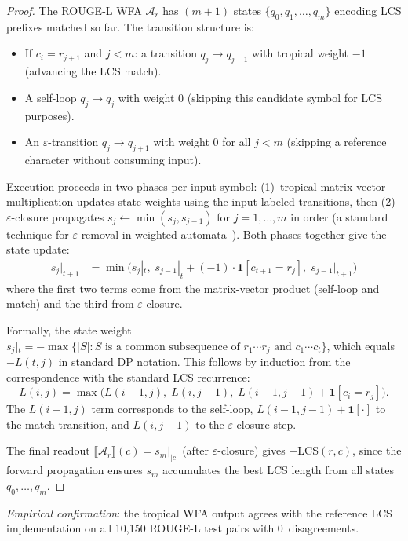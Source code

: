 \documentclass[11pt]{article}
\newcommand{\wfa}{\mathcal{A}}
\begin{document}
\begin{proof}
The ROUGE-L WFA $\wfa_r$ has $(m+1)$ states
$\{q_0, q_1, \ldots, q_m\}$ encoding LCS prefixes matched so far.
The transition structure is:
\begin{itemize}[nosep]
\item If $c_i = r_{j+1}$ and $j < m$: a transition
  $q_j \to q_{j+1}$ with tropical weight $-1$ (advancing the LCS match).
\item A self-loop $q_j \to q_j$ with weight $0$ (skipping this
  candidate symbol for LCS purposes).
\item An $\varepsilon$-transition $q_j \to q_{j+1}$ with weight $0$
  for all $j < m$ (skipping a reference character without consuming input).
\end{itemize}
Execution proceeds in two phases per input symbol:
(1)~tropical matrix-vector multiplication updates state weights
using the input-labeled transitions, then
(2)~$\varepsilon$-closure propagates $s_j \leftarrow \min(s_j, s_{j-1})$
for $j = 1, \ldots, m$ in order (a standard technique for
$\varepsilon$-removal in weighted automata~\cite{mohri2009weighted}).
Both phases together give the state update:
\begin{align*}
  s_j|_{t+1} &= \min\bigl(s_j|_t,\;
    s_{j-1}|_t + (-1)\cdot\mathbf{1}[c_{t+1} = r_j],\;
    s_{j-1}|_{t+1}\bigr)
\end{align*}
where the first two terms come from the matrix-vector product
(self-loop and match) and the third from $\varepsilon$-closure.

Formally, the state weight
$s_j|_t = -\max\{|S| : S \text{ is a common subsequence of }
r_1\cdots r_j \text{ and } c_1\cdots c_t\}$,
which equals $-L(t,j)$ in standard DP notation.
This follows by induction from the correspondence
with the standard LCS recurrence:
\[
L(i,j) = \max\bigl(L(i{-}1,j),\; L(i,j{-}1),\;
  L(i{-}1,j{-}1) + \mathbf{1}[c_i = r_j]\bigr).
\]
The $L(i{-}1,j)$ term corresponds to the self-loop,
$L(i{-}1,j{-}1) + \mathbf{1}[\cdot]$ to the match transition,
and $L(i,j{-}1)$ to the $\varepsilon$-closure step.

The final readout $\llbracket\wfa_r\rrbracket(c) = s_m|_{|c|}$
(after $\varepsilon$-closure) gives $-\text{LCS}(r,c)$, since the
forward propagation ensures $s_m$ accumulates the best LCS
length from all states $q_0, \ldots, q_m$.
\end{proof}

\noindent
\emph{Empirical confirmation}: the tropical WFA output agrees with
the reference LCS implementation on all 10{,}150 ROUGE-L test pairs
with 0~disagreements.
\end{document}
